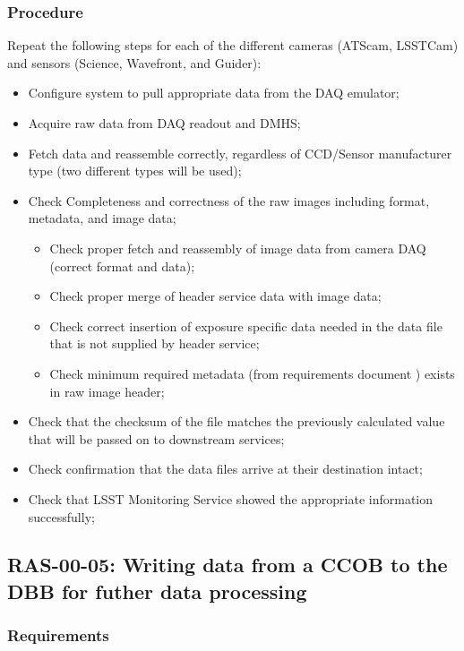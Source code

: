 \documentclass[DM,lsstdraft,STS,toc]{lsstdoc}
\begin{document}
\subsubsection{Procedure}
Repeat the following steps for each of the different cameras (ATScam, LSSTCam) and sensors (Science, Wavefront, and Guider):
\begin{itemize}
\item{Configure system to pull appropriate data from the DAQ emulator;}
\item{Acquire raw data from DAQ readout and DMHS;}
\item{Fetch data and reassemble correctly, regardless of CCD/Sensor manufacturer type (two different types will be used);}
\item{Check Completeness and correctness of the raw images including format, metadata, and image data;}
\begin{itemize}
\item{Check proper fetch and reassembly of image data from camera DAQ (correct format and data);}
\item{Check proper merge of header service data with image data;}
\item{Check correct insertion of exposure specific data needed in the data file that is not supplied by header service;}
\item{Check minimum required metadata (from requirements document ) exists in raw image header;}
\end{itemize}
\item{Check that the checksum of the file matches the previously calculated value that will be passed on to downstream services;}
\item{Check confirmation that the data files arrive at their destination intact;}
\item{Check that LSST Monitoring Service showed the appropriate information successfully;}
\end{itemize}

\subsection{RAS-00-05: Writing data from a CCOB to the DBB for futher data processing}
\label{ras-00-05}


\subsubsection{Requirements}
\end{document}
